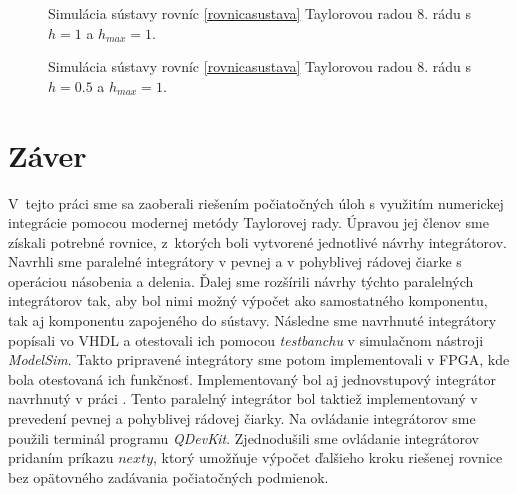 \begin{figure}[H]
\centering
{}
\caption{Simulácia sústavy rovníc \ref{rovnicasustava} Taylorovou radou 8. rádu s $ h = 1 $ a $ h_{max} = 1 $.}
\label{modelsim1}
\end{figure}

\begin{figure}[H]
\centering
{}
\caption{Simulácia sústavy rovníc \ref{rovnicasustava} Taylorovou radou 8. rádu s $ h = 0.5 $ a $ h_{max} = 1 $.}
\label{modelsim2}
\end{figure}


\chapter{Záver}
V~tejto práci sme sa zaoberali riešením počiatočných úloh s využitím numerickej integrácie pomocou modernej metódy Taylorovej rady. Úpravou jej členov sme získali potrebné rovnice, z~ktorých boli vytvorené jednotlivé návrhy integrátorov. Navrhli sme paralelné integrátory v pevnej a v pohyblivej rádovej čiarke s operáciou násobenia a delenia. Ďalej sme rozšírili návrhy týchto paralelných integrátorov tak, aby bol nimi možný výpočet ako samostatného komponentu, tak aj komponentu zapojeného do sústavy. Následne sme navrhnuté integrátory popísali vo VHDL a otestovali ich pomocou \textit{testbanchu} v simulačnom nástroji \textit{ModelSim}. Takto pripravené integrátory sme potom implementovali v FPGA, kde bola otestovaná ich funkčnosť. Implementovaný bol aj jednovstupový integrátor navrhnutý v práci \cite{OpalkaDP}. Tento paralelný integrátor bol taktiež implementovaný v prevedení pevnej a pohyblivej rádovej čiarky. Na ovládanie integrátorov sme použili terminál programu \textit{QDevKit}. Zjednodušili sme ovládanie integrátorov pridaním príkazu $ nexty $, ktorý umožňuje výpočet ďalšieho kroku riešenej rovnice bez opätovného zadávania počiatočných podmienok.

